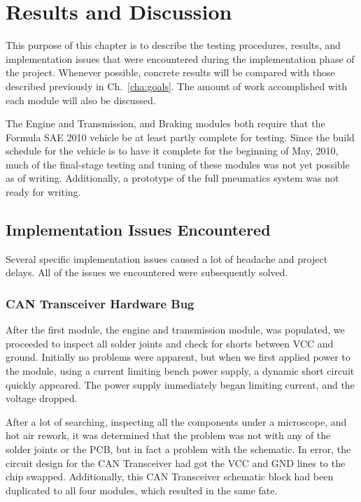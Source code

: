 \chapter{Results and Discussion}

This purpose of this chapter is to describe the testing procedures, results, and implementation issues that were encountered during the implementation phase of the project. Whenever possible, concrete results will be compared with those described previously in Ch.\ \ref{cha:goals}. The amount of work accomplished with each module will also be discussed.

The Engine and Transmission, and Braking modules both require that the Formula SAE 2010 vehicle be at least partly complete for testing. Since the build schedule for the vehicle is to have it complete for the beginning of May, 2010, much of the final-stage testing and tuning of these modules was not yet possible as of writing. Additionally, a prototype of the full pneumatics system was not ready for writing.










\section{Implementation Issues Encountered}

Several specific implementation issues caused a lot of headache and project delays. All of the issues we encountered were subsequently solved.

\subsection{CAN Transceiver Hardware Bug}

After the first module, the engine and transmission module, was populated, we proceeded to inspect all solder joints and check for shorts between VCC and ground. Initially no problems were apparent, but when we first applied power to the module, using a current limiting bench power supply, a dynamic short circuit quickly appeared. The power supply immediately began limiting current, and the voltage dropped.

After a lot of searching, inspecting all the components under a microscope, and hot air rework, it was determined that the problem was not with any of the solder joints or the PCB, but in fact a problem with the schematic. In error, the circuit design for the CAN Transceiver had got the VCC and GND lines to the chip swapped. Additionally, this CAN Transceiver schematic block had been duplicated to all four modules, which resulted in the same fate.

